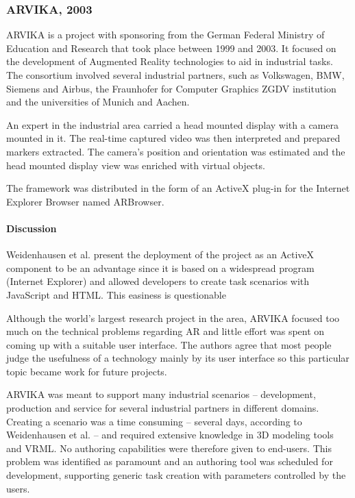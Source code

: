 


\subsubsection{ARVIKA, 2003}

ARVIKA \cite{ARVIKA} is a project with sponsoring from the
German Federal Ministry of Education and Research that took place between 1999 and 2003.
It focused on the development of Augmented Reality technologies to aid in industrial tasks.
The consortium involved several industrial partners, such as Volkswagen, BMW, Siemens and Airbus,
the Fraunhofer for Computer Graphics ZGDV institution and the universities of Munich and Aachen.

An expert in the industrial area carried a head mounted display with a camera mounted in it.
The real-time captured video was then interpreted and prepared markers extracted.
The camera's position and orientation was estimated and the head mounted display view was
enriched with virtual objects.


The framework was distributed in the form of an ActiveX plug-in for the Internet Explorer Browser
named ARBrowser.

\paragraph{Discussion}
\label{sec:Discussion}

Weidenhausen et al. \cite{ARVIKA-LESSONS} present the deployment of the project as an ActiveX component
to be an advantage since it is based on a widespread program (Internet Explorer) and allowed developers
to create task scenarios with JavaScript and HTML. This easiness is questionable 

Although the world's largest research project in the area, ARVIKA focused too
much on the technical problems regarding AR and little effort was spent on coming up with a
suitable user interface. The authors agree that most people judge the usefulness of a technology
mainly by its user interface so this particular topic became work for future projects. %

ARVIKA was meant to support many industrial scenarios -- development, production and service for several
industrial partners in different domains. Creating a scenario was a time consuming -- several days,
according to Weidenhausen et al. -- and required extensive knowledge in 3D modeling tools and VRML.
No authoring capabilities were therefore given to end-users.
This problem was identified as paramount and an authoring tool was scheduled for development,
supporting generic task creation with parameters controlled by the users.
